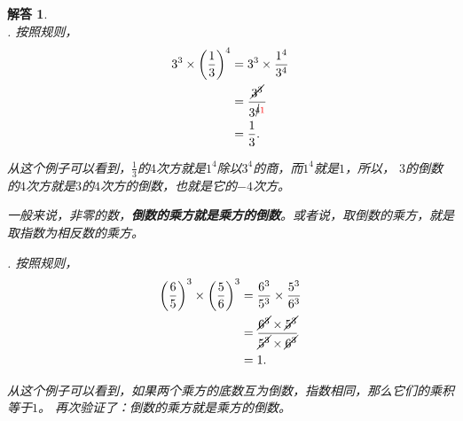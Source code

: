 \documentclass[12pt,UTF8]{ctexbook}
\newtheorem*{so}{解答}
\begin{document}
\begin{so}
    \mbox{} \\
    . 按照规则，
    \begin{align*}
        3^3 \times \left(\frac{1}{3}\right)^4 &= 3^3\times \frac{1^4}{3^4} \\
        &= \frac{\cancel{3^3}}{3^{\cancel{4}{\color{red} 1}}} \\
        &= \frac{1}{3}.
    \end{align*}
    
    从这个例子可以看到，$\frac{1}{3}$的$4$次方就是$1^4$除以$3^4$的商，而$1^4$就是$1$，所以，
    $3$的倒数的$4$次方就是$3$的$4$次方的倒数，也就是它的$-4$次方。

    一般来说，非零的数，\textbf{倒数的乘方就是乘方的倒数}。或者说，取倒数的乘方，就是取指数为相反数的乘方。

    . 按照规则，
    \begin{align*}
        \left(\frac{6}{5}\right)^3\times \left(\frac{5}{6}\right)^3 &= \frac{6^3}{5^3}\times \frac{5^3}{6^3} \\
        &= \frac{\cancel{6^3}\times \cancel{5^3}}{\cancel{5^3}\times \cancel{6^3}} \\
        &= 1.
    \end{align*}

    从这个例子可以看到，如果两个乘方的底数互为倒数，指数相同，那么它们的乘积等于$1$。
    再次验证了：倒数的乘方就是乘方的倒数。
    

\end{so}
\end{document}
